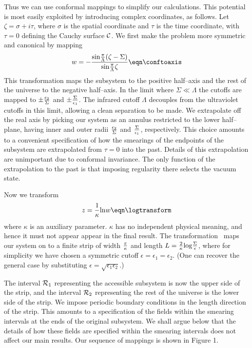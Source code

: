 Thus we
can use conformal mappings to simplify our calculations.
This potential is most easily exploited by
introducing complex coordinates, as follows. Let
$\zeta=\sigma+i\tau$, where $\sigma$ is the spatial coordinate and
$\tau$ is the time coordinate, with $\tau=0$ defining
the Cauchy surface $\cal C$.
We first make the problem more symmetric and canonical by
mapping
$$
w = -{ {\rm sin}{\pi\over\Lambda}(\zeta-\Sigma)\over {\rm sin}
{\pi\over\Lambda}\zeta }
\eqn\conftoaxis
$$
This transformation maps
the subsystem to the positive half--axis and the
rest of the universe to the negative half--axis.
In the limit where $\Sigma\ll\Lambda$ the cutoffs
are mapped to $\pm{\epsilon_2\over\Sigma}$ and
$\pm{\Sigma\over\epsilon_1}$.  The infrared
cutoff $\Lambda$ decouples from the ultraviolet
cutoffs in this limit, allowing a clean separation
to be made.
We extrapolate off the
real axis by picking our system as an annulus restricted to
the lower half--plane, having inner and outer radii $\epsilon_2\over\Sigma$
and $\Sigma\over\epsilon_1$, respectively. This choice amounts to a
convenient specification of how the smearings of the endpoints of the
subsystem are extrapolated from $\tau=0$
into the past.  Details of this extrapolation are unimportant
due to conformal invariance. The only function of the extrapolation
to the past is that imposing
regularity there selects
the vacuum state.

Now we transform
$$
z = {1\over\kappa} {\rm ln} w
\eqn\logtransform
$$
where $\kappa$ is an auxiliary parameter.  $\kappa$ has no
independent physical
meaning, and hence it must not appear appear in the
final result.
The transformation \logtransform\ maps
our system on to a finite strip of width $\pi\over\kappa$
and length $L= {2\over\kappa}{\rm log}{\Sigma\over\epsilon}$,
where for simplicity
we have chosen a symmetric cutoff $\epsilon=\epsilon_1=\epsilon_2$.
(One can recover the general case by
substituting $\epsilon=\sqrt{\epsilon_1\epsilon_2}$.)

The interval ${\cal R}_1$ representing the accessible subsystem
is now the upper side
of the strip, and the interval ${\cal R}_2$ representing the
rest of the universe is the lower side of the strip.
We impose periodic
boundary conditions in the length direction of the strip.
This amounts to a specification
of the fields within the smearing intervals at the ends of the original
subsystem.  We shall argue below that
the details of how these fields are specified
within the smearing intervals does not affect our main results.
Our sequence of mappings is shown in Figure 1.


